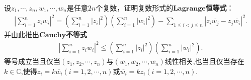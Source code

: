 \documentclass[../../main.tex]{subfiles}%
\begin{document}
\begin{theorem}
设$z_1,\cdots,z_n,w_1,\cdots,w_n$是任意$2n$个复数，证明复数形式的$\mathbf{Lagrange}$\textbf{恒等式}：
\begin{align*}
\left| \sum_{i=1}^n{z_iw_i} \right|^2=\left( \sum_{i=1}^n{|z_i|^2} \right) \left( \sum_{i=1}^n{|w_i|^2} \right) -\sum_{1\leqslant i<j\leqslant n}{\left| z_i\overline{w_j}-z_j\overline{w_i} \right|^2}.
\end{align*}
并由此推出$\mathbf{Cauchy}$\textbf{不等式}
\begin{align*}
\left| \sum_{i=1}^n{z_iw_i} \right|^2\leqslant \left( \sum_{i=1}^n{|z_i|^2} \right) \left( \sum_{i=1}^n{|w_i|^2} \right) .
\end{align*}
等号成立当且仅当$(z_1,z_2,\cdots,z_n)$与$(\overline{w_1},\overline{w_2},\cdots,\overline{w_n})$线性相关,也当且仅当存在$k\in \mathbb{C}$,使得$z_i=k\overline{w_i}\left( i=1,2,\cdots ,n \right)$或$\overline{w_i}=kz_i\left( i=1,2,\cdots ,n \right) $.
\end{theorem}
\end{document}
